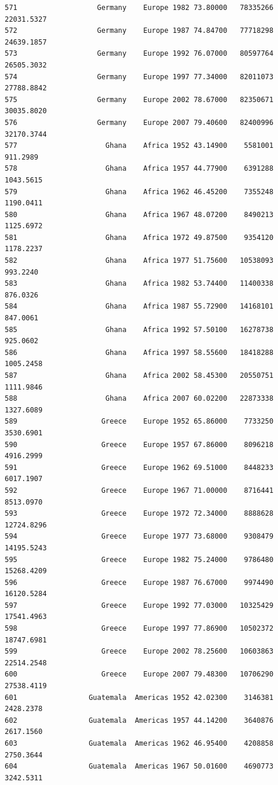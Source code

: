 \documentclass[
  letterpaper,
  DIV=11,
  numbers=noendperiod]{scrreprt}
\begin{document}
\begin{verbatim}
571                   Germany    Europe 1982 73.80000   78335266  22031.5327
572                   Germany    Europe 1987 74.84700   77718298  24639.1857
573                   Germany    Europe 1992 76.07000   80597764  26505.3032
574                   Germany    Europe 1997 77.34000   82011073  27788.8842
575                   Germany    Europe 2002 78.67000   82350671  30035.8020
576                   Germany    Europe 2007 79.40600   82400996  32170.3744
577                     Ghana    Africa 1952 43.14900    5581001    911.2989
578                     Ghana    Africa 1957 44.77900    6391288   1043.5615
579                     Ghana    Africa 1962 46.45200    7355248   1190.0411
580                     Ghana    Africa 1967 48.07200    8490213   1125.6972
581                     Ghana    Africa 1972 49.87500    9354120   1178.2237
582                     Ghana    Africa 1977 51.75600   10538093    993.2240
583                     Ghana    Africa 1982 53.74400   11400338    876.0326
584                     Ghana    Africa 1987 55.72900   14168101    847.0061
585                     Ghana    Africa 1992 57.50100   16278738    925.0602
586                     Ghana    Africa 1997 58.55600   18418288   1005.2458
587                     Ghana    Africa 2002 58.45300   20550751   1111.9846
588                     Ghana    Africa 2007 60.02200   22873338   1327.6089
589                    Greece    Europe 1952 65.86000    7733250   3530.6901
590                    Greece    Europe 1957 67.86000    8096218   4916.2999
591                    Greece    Europe 1962 69.51000    8448233   6017.1907
592                    Greece    Europe 1967 71.00000    8716441   8513.0970
593                    Greece    Europe 1972 72.34000    8888628  12724.8296
594                    Greece    Europe 1977 73.68000    9308479  14195.5243
595                    Greece    Europe 1982 75.24000    9786480  15268.4209
596                    Greece    Europe 1987 76.67000    9974490  16120.5284
597                    Greece    Europe 1992 77.03000   10325429  17541.4963
598                    Greece    Europe 1997 77.86900   10502372  18747.6981
599                    Greece    Europe 2002 78.25600   10603863  22514.2548
600                    Greece    Europe 2007 79.48300   10706290  27538.4119
601                 Guatemala  Americas 1952 42.02300    3146381   2428.2378
602                 Guatemala  Americas 1957 44.14200    3640876   2617.1560
603                 Guatemala  Americas 1962 46.95400    4208858   2750.3644
604                 Guatemala  Americas 1967 50.01600    4690773   3242.5311

\end{verbatim}
\end{document}
